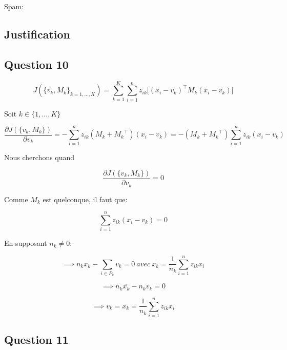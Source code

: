 \documentclass[a4paper,11pt,oneside,roman]{article}
\begin{document}
    Spam:

    \subsection{Justification}
    \subsection*{Question 10}
    \begin{equation}
        J(\{v_k, M_k\}_{k=1,...,K}) = \sum^{K}_{k=1}\sum^{n}_{i=1} z_{ik} \big[ (x_i-v_k)^\top M_k (x_i-v_k)\big]
    \end{equation}

    Soit $k\in \{1,...,K\}$

    \begin{equation}
        \frac{\partial J(\{v_k, M_k\})}{\partial v_k} = -\sum^{n}_{i=1} z_{ik} (M_k + {M_k}^\top) (x_i-v_k) = -(M_k + {M_k}^\top) \sum^{n}_{i=1} z_{ik} (x_i-v_k)
    \end{equation}

    Nous cherchons quand 

    \begin{equation}
        \frac{\partial J(\{v_k, M_k\})}{\partial v_k} = 0
    \end{equation}

    Comme $M_k$ est quelconque, il faut que:

    \begin{equation}
        \sum^{n}_{i=1} z_{ik} (x_i-v_k) = 0
    \end{equation}
    
    En supposant $n_k \neq 0$:

    \begin{equation}
        \implies n_k \overline{x_k} - \sum_{i\in P_k} v_k = 0 \ avec \ \overline{x_k} = \frac{1}{n_k}\sum_{i=1}^{n}z_{ik}x_i
    \end{equation}

    \begin{equation}
        \implies n_k \overline{x_k} - n_k v_k = 0
    \end{equation}
    
    \begin{equation}
        \implies v_k = \overline{x_k} = \frac{1}{n_k}\sum_{i=1}^{n}z_{ik}x_i
    \end{equation}

    \subsection*{Question 11}
\end{document}
